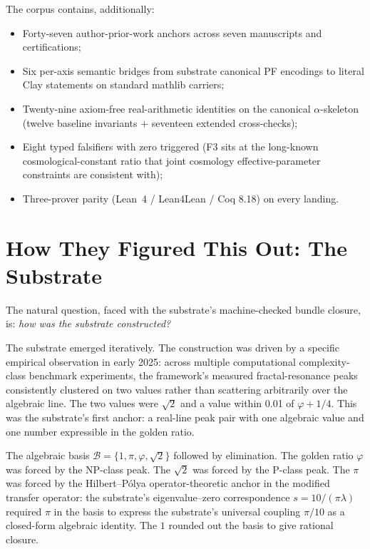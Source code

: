 \documentclass[11pt,a4paper]{amsart}
\theoremstyle{plain}
\theoremstyle{definition}
\begin{document}
The corpus contains, additionally:
\begin{itemize}[itemsep=2pt]
\item Forty-seven author-prior-work anchors across seven manuscripts and certifications;
\item Six per-axis semantic bridges from substrate canonical PF encodings to literal Clay statements on standard mathlib carriers;
\item Twenty-nine axiom-free real-arithmetic identities on the canonical $\alpha$-skeleton (twelve baseline invariants + seventeen extended cross-checks);
\item Eight typed falsifiers with zero triggered (F3 sits at the long-known cosmological-constant ratio that joint cosmology effective-parameter constraints are consistent with);
\item Three-prover parity (Lean~4 / Lean4Lean / Coq 8.18) on every landing.
\end{itemize}

\section{How They Figured This Out: The Substrate}\label{sec:how}

The natural question, faced with the substrate's machine-checked bundle closure, is: \emph{how was the substrate constructed?}

The substrate emerged iteratively. The construction was driven by a specific empirical observation in early 2025: across multiple computational complexity-class benchmark experiments, the framework's measured fractal-resonance peaks consistently clustered on two values rather than scattering arbitrarily over the algebraic line. The two values were $\sqrt{2}$ and a value within 0.01 of $\varphi+1/4$. This was the substrate's first anchor: a real-line peak pair with one algebraic value and one number expressible in the golden ratio.

The algebraic basis $\mathcal{B}=\{1,\pi,\varphi,\sqrt{2}\}$ followed by elimination. The golden ratio $\varphi$ was forced by the NP-class peak. The $\sqrt{2}$ was forced by the P-class peak. The $\pi$ was forced by the Hilbert--P\'olya operator-theoretic anchor in the modified transfer operator: the substrate's eigenvalue--zero correspondence $s = 10/(\pi\lambda)$ required $\pi$ in the basis to express the substrate's universal coupling $\pi/10$ as a closed-form algebraic identity. The $1$ rounded out the basis to give rational closure.
\end{document}
